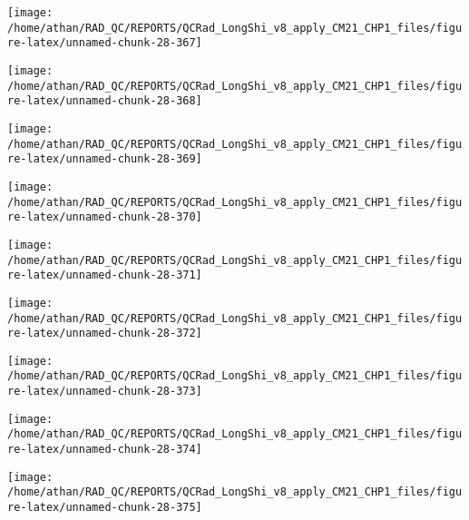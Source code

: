 \documentclass[
  10pt,
  a4paper,oneside]{article}
\begin{document}
\begin{center}\texttt{[image: /home/athan/RAD\_QC/REPORTS/QCRad\_LongShi\_v8\_apply\_CM21\_CHP1\_files/figure-latex/unnamed-chunk-28-367]} \end{center}

\begin{center}\texttt{[image: /home/athan/RAD\_QC/REPORTS/QCRad\_LongShi\_v8\_apply\_CM21\_CHP1\_files/figure-latex/unnamed-chunk-28-368]} \end{center}

\begin{center}\texttt{[image: /home/athan/RAD\_QC/REPORTS/QCRad\_LongShi\_v8\_apply\_CM21\_CHP1\_files/figure-latex/unnamed-chunk-28-369]} \end{center}

\begin{center}\texttt{[image: /home/athan/RAD\_QC/REPORTS/QCRad\_LongShi\_v8\_apply\_CM21\_CHP1\_files/figure-latex/unnamed-chunk-28-370]} \end{center}

\begin{center}\texttt{[image: /home/athan/RAD\_QC/REPORTS/QCRad\_LongShi\_v8\_apply\_CM21\_CHP1\_files/figure-latex/unnamed-chunk-28-371]} \end{center}

\begin{center}\texttt{[image: /home/athan/RAD\_QC/REPORTS/QCRad\_LongShi\_v8\_apply\_CM21\_CHP1\_files/figure-latex/unnamed-chunk-28-372]} \end{center}

\begin{center}\texttt{[image: /home/athan/RAD\_QC/REPORTS/QCRad\_LongShi\_v8\_apply\_CM21\_CHP1\_files/figure-latex/unnamed-chunk-28-373]} \end{center}

\begin{center}\texttt{[image: /home/athan/RAD\_QC/REPORTS/QCRad\_LongShi\_v8\_apply\_CM21\_CHP1\_files/figure-latex/unnamed-chunk-28-374]} \end{center}

\begin{center}\texttt{[image: /home/athan/RAD\_QC/REPORTS/QCRad\_LongShi\_v8\_apply\_CM21\_CHP1\_files/figure-latex/unnamed-chunk-28-375]} \end{center}
\end{document}
